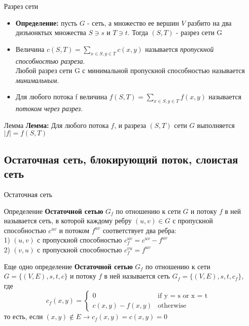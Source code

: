 \documentclass{beamer}
\begin{document}
\begin{frame}{Разрез сети}
  \begin{itemize}
    \item {
        \textbf{Определение: } пусть $G$ - сеть, а множество ее вершин $V$ разбито на два дизъюнктых множества $S \ni s$ и $T \ni t$. Тогда $(S,T)$ - разрез сети G
        \pause
    }
    \item {
        Величина $c(S, T) =  \sum\limits_{x \in S, y \in T} c(x, y)$ называется \emph{пропускной способностью разреза}. \\ Любой разрез сети G с минимальной пропускной способностью называется \emph{минимальным}.
    }
    \item {
        Для любого потока f величина $f(S, T) =  \sum\limits_{x \in S, y \in T} f(x, y)$ называется \emph{потоком через разрез}.
        \pause
    }
    \end{itemize}
    \begin{block}{Лемма}
        \textbf{Лемма: } Для любого потока $f$, и разреза $(S, T)$ сети $G$ выполняется $|f| = f(S, T)$
    \end{block}
\end{frame}

\subsection{Остаточная сеть, блокирующий поток, слоистая сеть}

\begin{frame}{Остаточная сеть}
    \begin{exampleblock}{Определение}
        \textbf{Остаточной сетью} $G_{f}$ по отношению к сети $G$ и потоку $f$ в ней называется сеть, в которой каждому ребру $(u, v) \in G$ с пропускной способностью $c^{uv}$ и потоком $f^{uv}$ соответствует два ребра: \\
            1) $(u, v)$ с пропускной способностью $c_{f}^{uv} = c^{uv} - f^{uv}$\\
            2) $(v, u)$ с пропускной способностью $c_{f}^{vu} = f^{uv}$
    \end{exampleblock}
    \pause
    \begin{exampleblock}{Еще одно определение}
        \textbf{Остаточной сетью} $G_{f}$ по отношению к сети $G = \{(V, E), s, t, c\}$ и потоку $f$ в ней называется сеть $G_{f} = \{(V, E), s, t, c_{f}\}$, где 
        \begin{equation*}
        c_{f}(x, y) = 
         \begin{cases}
           0 &\text{if y = s or x = t}\\
           c(x, y) - f(x, y) &\text{otherwise}
         \end{cases}
        \end{equation*}
        то есть, если $(x, y) \not \in E \rightarrow c_f(x, y) = c(x, y) = 0$
    \end{exampleblock}
\end{frame}
\end{document}
